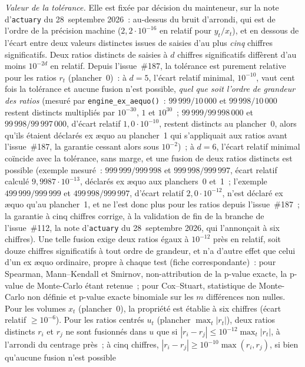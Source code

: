 \documentclass[a4paper,11pt]{article}
\newcommand{\code}[1]{\texttt{\small #1}}
\begin{document}
\emph{Valeur de la tolérance.} Elle est fixée par décision du mainteneur, sur la note
d'\code{actuary} du 28~septembre 2026~: au-dessus du bruit d'arrondi, qui est de l'ordre de la
précision machine ($2{,}2\cdot 10^{-16}$ en relatif pour $y_t/x_t$), et en dessous de l'écart
entre deux valeurs distinctes issues de saisies d'au plus \emph{cinq} chiffres significatifs.
Deux ratios distincts de saisies à $d$ chiffres significatifs diffèrent d'au moins $10^{-2d}$ en
relatif. Depuis l'issue~\#187, la tolérance est purement relative pour les ratios $r_t$
(plancher~0)~: à $d = 5$, l'écart relatif minimal, $10^{-10}$, vaut cent fois la tolérance et
aucune fusion n'est possible, \emph{quel que soit l'ordre de grandeur des ratios} (mesuré par
\code{engine\_ex\_aequo()}~: $99\,999/10\,000$ et $99\,998/10\,000$ restent distincts multipliés
par $10^{-30}$, $1$ et $10^{30}$~; $99\,999/99\,998\,000$ et $99\,998/99\,997\,000$, d'écart relatif
$1{,}0\cdot 10^{-10}$, restent distincts au plancher~0, alors qu'ils étaient déclarés ex \ae quo au
plancher~1 qui s'appliquait aux ratios avant l'issue~\#187, la garantie cessant alors sous
$10^{-2}$)~; à $d = 6$, l'écart relatif minimal coïncide avec la tolérance, sans marge, et une
fusion de deux ratios distincts est possible (exemple mesuré~: $999\,999/999\,998$ et
$999\,998/999\,997$, écart relatif calculé $9{,}9987\cdot 10^{-13}$, déclarés ex \ae quo aux
planchers~0 et~1~; l'exemple $499\,999/999\,999$ et $499\,998/999\,997$, d'écart relatif
$2{,}0\cdot 10^{-12}$, n'est déclaré ex \ae quo qu'au plancher~1, et ne l'est donc plus pour les
ratios depuis l'issue~\#187~; la garantie à cinq chiffres corrige, à la validation de fin de la
branche de l'issue~\#112, la note d'\code{actuary} du 28~septembre 2026, qui l'annonçait à six
chiffres). Une telle fusion exige deux ratios égaux à $10^{-12}$ près en relatif, soit douze
chiffres significatifs à tout ordre de grandeur, et n'a
d'autre effet que celui d'un ex \ae quo ordinaire, propre à chaque test (fiche
correspondante)~: pour Spearman, Mann--Kendall et Smirnov, non-attribution de la p-value exacte,
la p-value de Monte-Carlo étant retenue~; pour Cox--Stuart, statistique de Monte-Carlo non
définie et p-value exacte binomiale sur les $m$ différences non nulles. Pour les volumes
$x_t$ (plancher~0), la propriété est établie à six chiffres (écart relatif $\ge 10^{-6}$). Pour
les ratios centrés $u_t$ (plancher $\max_t|r_t|$), deux ratios distincts $r_i$ et $r_j$ ne sont
fusionnés dans $u$ que si $|r_i - r_j| \le 10^{-12}\max_t|r_t|$, à l'arrondi du centrage près~; à
cinq chiffres, $|r_i - r_j| \ge 10^{-10}\max(r_i, r_j)$, si bien qu'aucune fusion n'est possible
\end{document}
